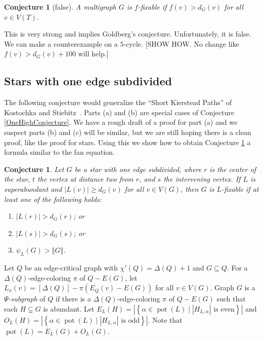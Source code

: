 \documentclass[12pt]{article}
\theoremstyle{plain}
\newtheorem{conjecture}[thm]{Conjecture}
\theoremstyle{definition}
\theoremstyle{remark}
\newcommand{\setb}[3]{\left\{ #1 \in #2 \mid #3 \right\}}
\newcommand{\card}[1]{\left|#1\right|}
\newcommand{\size}[1]{\left\Vert#1\right\Vert}
\newcommand{\irange}[1]{\left[#1\right]}
\newcommand{\parens}[1]{\left( #1 \right)}
\newcommand{\pot}{\operatorname{pot}}
\begin{document}
\begin{conjecture}[false]\label{MoonshineConjecture}
	A multigraph $G$ is $f$-fixable if $f(v) > d_G(v)$ for all $v \in V(T)$.
\end{conjecture}

This is very strong and implies Goldberg's conjecture.  Unfortunately, it is false. 
We can make a counterexample on a $5$-cycle. [SHOW HOW.  No change like $f(v) >
d_G(v) + 100$ will help.] 
	
\subsection{Stars with one edge subdivided}
The following conjecture would generalize the ``Short Kierstead Paths'' of Kostochka
and Stiebitz~\cite{ShortPaths-KS}.  Parts (a) and (b) are special cases of
Conjecture \ref{OneHighConjecture}.  We have a rough draft of a proof for part (a) and we suspect parts (b) and (c) will be similar, 
but we are still hoping there is a clean proof, like the proof for stars.
Using this we show how to obtain Conjecture \ref{StarWithOneEdgeSubdivided} a formula similar to the fan equation.

\begin{conjecture}\label{StarWithOneEdgeSubdivided}
Let $G$ be a star with one edge subdivided, where $r$ is the center of the
star, $t$ the vertex at distance two from $r$, and $s$ the intervening vertex.  
If $L$ is superabundant and $|L(v)| \ge d_G(v)$ for all 
$v \in V(G)$, then $G$ is $L$-fixable if at least one of the following holds:
\begin{enumerate}
\item[(a)] $|L(r)| > d_G(r)$; or
\item[(b)] $|L(s)| > d_G(s)$; or
\item[(c)] $\psi_L(G) > \size{G}$.
\end{enumerate}
\end{conjecture}

Let $Q$ be an edge-critical graph with $\chi'(Q) = \Delta(Q) + 1$ and $G
\subseteq Q$.  For a $\Delta(Q)$-edge-coloring $\pi$ of $Q - E(G)$, let
$L_\pi(v) = \irange{\Delta(Q)} - \pi\parens{E_Q(v) - E(G)}$ for all $v \in
V(G)$.  Graph $G$ is a \emph{$\Psi$-subgraph} of $Q$ if there is a
$\Delta(Q)$-edge-coloring $\pi$ of $Q - E(G)$ such that each $H \subsetneq G$
is abundant. Let $E_{L}(H) = \card{\setb{\alpha}{\pot(L)}{\card{H_{L, \alpha}}
\text{ is even}}}$ and $O_{L}(H) = \card{\setb{\alpha}{\pot(L)}{\card{H_{L,
\alpha}} \text{ is odd}}}$.  Note that $\pot(L) = E_{L}(G) + O_{L}(G)$.
\end{document}
